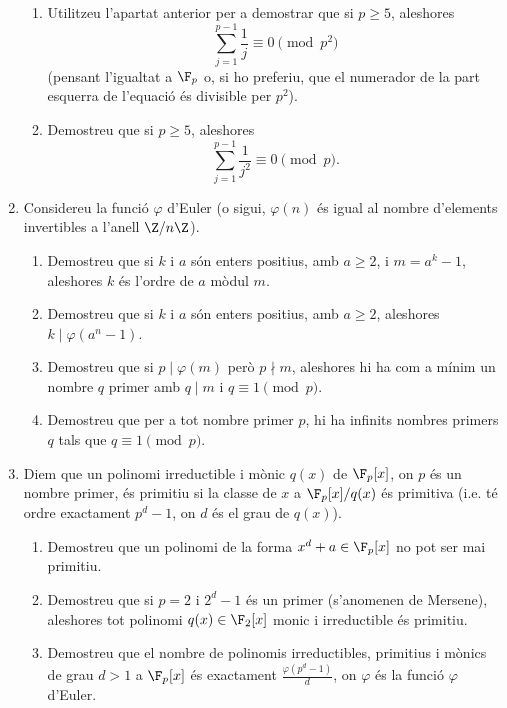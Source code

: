 \begin{enumerate}[leftmargin=*]
\begin{enumerate}
\item Utilitzeu l'apartat anterior per a demostrar que si
$p\ge 5$, aleshores
$$\sum_{j=1}^{p-1} \frac 1j \equiv 0 \pmod{p^2}$$
(pensant l'igualtat a $\F_p$ o, si ho preferiu, que el numerador de
la part esquerra de l'equació és divisible per $p^2$).

\item Demostreu que si $p\ge 5$, aleshores
$$\sum_{j=1}^{p-1} \frac 1{j^2} \equiv 0 \pmod{p}.$$
\end{enumerate}

\item Considereu la funció $\varphi$ d'Euler (o sigui,
$\varphi(n)$ és igual al nombre d'elements invertibles a l'anell
$\Z/n \Z$).
\begin{enumerate}
\item Demostreu que si $k$ i $a$ són enters positius, amb
$a\ge 2$, i $m=a^k-1$, aleshores $k$ és l'ordre de $a$ mòdul $m$.

\item Demostreu que si $k$ i $a$ són enters positius, amb
$a\ge 2$, aleshores $k\mid \varphi(a^n-1)$.

\item Demostreu que si $p \mid\varphi(m)$ però $p
\nmid m$, aleshores hi ha com a mínim un nombre $q$ primer
amb $q\mid m$ i $q\equiv 1 \pmod{p}$.

\item Demostreu que per a tot nombre primer $p$, hi ha
infinits nombres primers $q$ tals que $q\equiv 1 \pmod{p}$.
\end{enumerate}

\item Diem que un polinomi irreductible i mònic $q(x)$ de
$\F_p[x]$, on $p$ és un nombre primer, és primitiu si la classe de
$x$ a $\F_p[x]/q(x)$ és primitiva (i.e. té ordre exactament $p^d-1$,
on $d$ és el grau de $q(x)$).

\begin{enumerate}
\item Demostreu que un polinomi de la forma $x^d+a\in \F_p[x]$ no
pot ser mai primitiu.

\item Demostreu que si $p=2$ i
$2^d-1$ és un primer (s'anomenen de Mersene), aleshores tot polinomi
$q(x)\in \F_2[x]$ monic i irreductible és primitiu.

\item Demostreu que el nombre de polinomis irreductibles, primitius
i mònics de grau $d>1$ a $\F_p[x]$ és exactament $\frac
{\varphi(p^d-1)}{d}$, on $\varphi$ és la funció $\varphi$ d'Euler.


\end{enumerate}
\end{enumerate}
